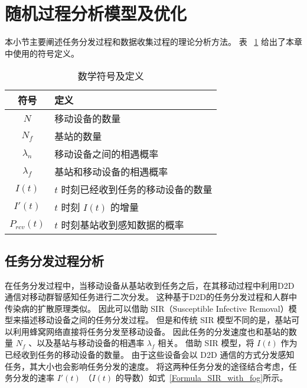 \section{随机过程分析模型及优化}
本小节主要阐述任务分发过程和数据收集过程的理论分析方法。
表 ~\ref{table_notations} 给出了本章中使用的符号定义。

\begin{table}[h]
  \vspace{-1.5em}
  \caption{数学符号及定义}
  \vspace{-0.5em}
  \centering
  \label{table_notations}
  \begin{tabular}{|c|p{7cm}|}
  \hline
  \textbf{符号} & \textbf{定义}\\
  \hline
  $N$ & 移动设备的数量\\\hline
  $N_f$ & 基站的数量\\\hline
  $\lambda_n$ & 移动设备之间的相遇概率\\\hline
  $\lambda_f$ & 基站和移动设备的相遇概率\\\hline
  $I(t)$ & $t$ 时刻已经收到任务的移动设备的数量\\\hline
  $I'(t)$ & $t$ 时刻 $I(t)$ 的增量\\\hline
  $P_{rcv}(t)$ & $t$ 时刻基站收到感知数据的概率\\\hline
  \end{tabular}
  \vspace{-1em}
\end{table}

\subsection{任务分发过程分析}

在任务分发过程中，当移动设备从基站收到任务之后，在其移动过程中利用D2D通信对移动群智感知任务进行二次分发。
这种基于D2D的任务分发过程和人群中传染病的扩散原理类似。
因此可以借助 SIR（Susceptible Infective Removal）模型来描述移动设备之间的任务分发过程。
但是和传统 SIR 模型不同的是，基站可以利用蜂窝网络直接将任务分发至移动设备。
因此任务的分发速度也和基站的数量 $N_f$ 、以及基站与移动设备的相遇率 $\lambda_f$ 相关。
借助 SIR 模型，将 $I(t)$ 作为已经收到任务的移动设备的数量。
由于这些设备会以 D2D 通信的方式分发感知任务，其大小也会影响任务分发的速度。
将这两种任务分发的途径结合考虑，任务分发的速率 $I'(t)$ （$I(t)$ 的导数）如式~\eqref{Formula_SIR_with_fog}所示。

